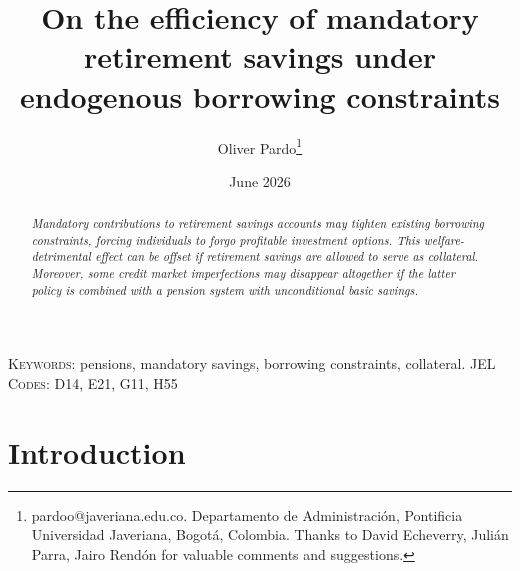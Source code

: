 \documentclass[draft,pdftex,nolinenumbers,noinfoline]{article}
\theoremstyle{plain}
\begin{document}
\title{On the efficiency of mandatory retirement savings under endogenous borrowing constraints}
\date{June 2026}

\author{
{Oliver Pardo\footnote{pardoo@javeriana.edu.co. Departamento de Administraci\'{o}n, Pontificia Universidad Javeriana, Bogot\'{a}, Colombia. Thanks to David Echeverry, Juli\'{a}n Parra, Jairo Rend\'on for valuable comments and suggestions.}} 
}

\maketitle
\setcounter{page}{1}






\begin{abstract}
\textit{
Mandatory contributions to retirement savings accounts may tighten existing borrowing constraints, forcing individuals to forgo profitable investment options. This welfare-detrimental effect can be offset if retirement savings are allowed to serve as collateral. Moreover, some credit market imperfections may disappear altogether if the latter policy is combined with a pension system with unconditional basic savings.
}
\end{abstract}

\textsc{Keywords}: pensions, mandatory savings, borrowing constraints, collateral.
\textsc{JEL Codes}: D14, E21, G11, H55

\section{Introduction}
\end{document}
